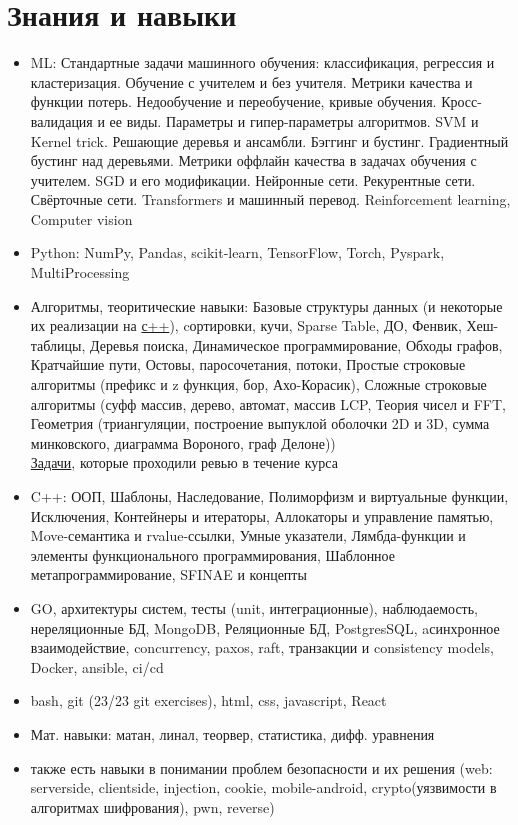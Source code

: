 \documentclass[a4paper,10pt]{article}
\begin{document}
\section*{Знания и навыки}
\noindent
\begin{itemize}[noitemsep]
    \item ML: Стандартные задачи машинного обучения: классификация, регрессия и кластеризация. Обучение с учителем и без учителя. Метрики качества и функции потерь. Недообучение и переобучение, кривые обучения. Кросс-валидация и ее виды. Параметры и гипер-параметры алгоритмов.
    SVM и Kernel trick.
    Решающие деревья и ансамбли.
    Бэггинг и бустинг.
    Градиентный бустинг над деревьями.
    Метрики оффлайн качества в задачах обучения с учителем.
    SGD и его модификации.
    Нейронные сети.
    Рекурентные сети.
    Свёрточные сети.
    Transformers и машинный перевод.
    Reinforcement learning, Computer vision
    \item Python: NumPy, Pandas, scikit-learn, TensorFlow, Torch, Pyspark, MultiProcessing
    \item Алгоритмы, теоритические навыки: Базовые структуры данных (и некоторые их реализации на \href{https://github.com/grgtr/MIPT-CPP}{с++}), cортировки, кучи, Sparse Table, ДО, Фенвик, Хеш-таблицы, Деревья поиска, Динамическое программирование, Обходы графов, Кратчайшие пути, Остовы, паросочетания, потоки, Простые строковые алгоритмы (префикс и z функция, бор, Ахо-Корасик), Сложные строковые алгоритмы (суфф массив, дерево, автомат, массив LCP, Теория чисел и FFT, Геометрия (триангуляции, построение выпуклой оболочки 2D и 3D, сумма минковского, диаграмма Вороного, граф Делоне)) \\
    \href{https://gitlab.com/grgtr}{Задачи}, которые проходили ревью в течение курса
    \item C++: ООП, Шаблоны, Наследование, Полиморфизм и виртуальные функции, Исключения, Контейнеры и итераторы, Аллокаторы и управление памятью, Move-семантика и rvalue-ссылки, Умные указатели, Лямбда-функции и элементы функционального программирования, Шаблонное метапрограммирование, SFINAE и концепты

    \item GO, архитектуры систем, тесты (unit, интеграционные), наблюдаемость, нереляционные БД, MongoDB, Реляционные БД, PostgresSQL, aсинхронное взаимодействие, concurrency, paxos, raft, транзакции и consistency models, Docker, ansible, ci/cd

    \item bash, git (23/23 git exercises), html, css, javascript, React
    \item Мат. навыки: матан, линал, теорвер, статистика, дифф. уравнения
    \item также есть навыки в понимании проблем безопасности и их решения (web: serverside, clientside, injection, cookie, mobile-android, crypto(уязвимости в алгоритмах шифрования), pwn, reverse)
\end{itemize}
\end{document}
